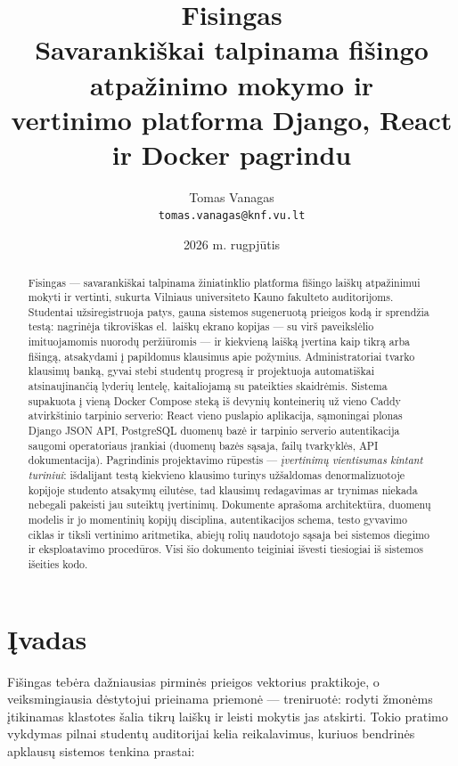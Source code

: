 \documentclass[11pt,a4paper]{article}
\title{\textbf{Fisingas}\\[4pt]
  \large Savarankiškai talpinama fišingo atpažinimo mokymo ir\\
  vertinimo platforma Django, React ir Docker pagrindu}
\author{Tomas Vanagas\\[2pt]
  \normalsize\texttt{tomas.vanagas@knf.vu.lt}}
\date{2026 m. rugpjūtis}
\begin{document}
\maketitle

\begin{abstract}
\noindent
Fisingas — savarankiškai talpinama žiniatinklio platforma fišingo
laiškų atpažinimui mokyti ir vertinti, sukurta Vilniaus universiteto
Kauno fakulteto auditorijoms. Studentai užsiregistruoja patys, gauna
sistemos sugeneruotą prieigos kodą ir sprendžia testą: nagrinėja
tikroviškas el.~laiškų ekrano kopijas — su virš paveikslėlio
imituojamomis nuorodų peržiūromis — ir kiekvieną laišką įvertina kaip
tikrą arba fišingą, atsakydami į papildomus klausimus apie požymius.
Administratoriai tvarko klausimų banką, gyvai stebi studentų progresą
ir projektuoja automatiškai atsinaujinančią lyderių lentelę,
kaitaliojamą su pateikties skaidrėmis. Sistema supakuota į vieną
Docker Compose steką iš devynių konteinerių už vieno Caddy
atvirkštinio tarpinio serverio: React vieno puslapio aplikacija,
sąmoningai plonas Django JSON API, PostgreSQL duomenų bazė ir
tarpinio serverio autentikacija saugomi operatoriaus įrankiai
(duomenų bazės sąsaja, failų tvarkyklės, API dokumentacija).
Pagrindinis projektavimo rūpestis — \emph{įvertinimų vientisumas
kintant turiniui}: išdalijant testą kiekvieno klausimo turinys
užšaldomas denormalizuotoje kopijoje studento atsakymų eilutėse, tad
klausimų redagavimas ar trynimas niekada nebegali pakeisti jau
suteiktų įvertinimų. Dokumente aprašoma architektūra, duomenų modelis
ir jo momentinių kopijų disciplina, autentikacijos schema, testo
gyvavimo ciklas ir tiksli vertinimo aritmetika, abiejų rolių
naudotojo sąsaja bei sistemos diegimo ir eksploatavimo procedūros.
Visi šio dokumento teiginiai išvesti tiesiogiai iš sistemos išeities
kodo.
\end{abstract}

\tableofcontents
\newpage

\section{Įvadas}

Fišingas tebėra dažniausias pirminės prieigos vektorius praktikoje, o
veiksmingiausia dėstytojui prieinama priemonė — treniruotė: rodyti
žmonėms įtikinamas klastotes šalia tikrų laiškų ir leisti mokytis jas
atskirti. Tokio pratimo vykdymas pilnai studentų auditorijai kelia
reikalavimus, kuriuos bendrinės apklausų sistemos tenkina prastai:
\end{document}
